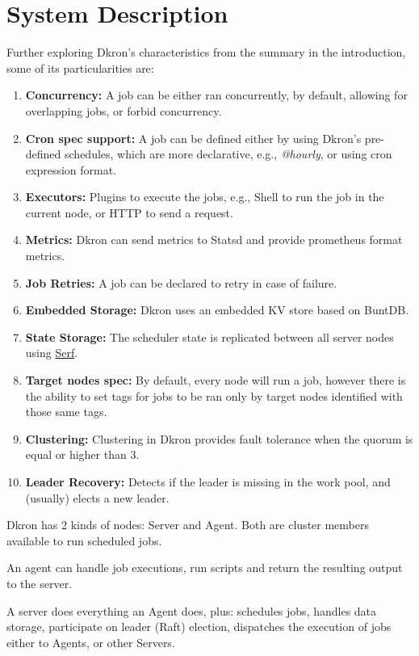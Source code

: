 \documentclass[runningheads]{llncs}
\begin{document}
\section{System Description}
\label{system_description}

Further exploring Dkron's characteristics from the summary in the introduction, some of its  particularities are:
\begin{enumerate}
    \item \textbf{Concurrency:} A job can be either ran concurrently, by default,
    allowing for overlapping jobs, or forbid concurrency.
    \item \textbf{Cron spec support:} A job can be defined either by using Dkron's
    pre-defined schedules, which are more declarative, e.g., \textit{@hourly}, or using cron expression format.
    \item \textbf{Executors:} Plugins to execute the jobs, e.g., Shell to run the job in
    the current node, or HTTP to send a request.
    \item \textbf{Metrics:} Dkron can send metrics to Statsd and provide prometheus format metrics.
    \item \textbf{Job Retries:} A job can be declared to retry in case of failure.
    \item \textbf{Embedded Storage:} Dkron uses an embedded KV store based on BuntDB.
    \item \textbf{State Storage:} The scheduler state is replicated between all
    server nodes using \href{https://www.serf.io/}{Serf}.
    \item \textbf{Target nodes spec:} By default, every node will run a job, however there is
    the ability to set tags for jobs to be ran only by target nodes identified with those
    same tags.
    \item \textbf{Clustering:} Clustering in Dkron provides fault tolerance when the
    quorum is equal or higher than 3.
    \item \textbf{Leader Recovery:} Detects if the leader is missing in the work pool,
    and (usually) elects a new leader.
\end{enumerate}


Dkron has 2 kinds of nodes: Server and Agent.
Both are cluster members available to run scheduled jobs.

An agent can handle job executions, run scripts and return the resulting output to the server.

A server does everything an Agent does, plus: schedules jobs, handles data storage,
participate on leader (Raft) election, dispatches the execution of jobs either to Agents,
or other Servers.
\end{document}

